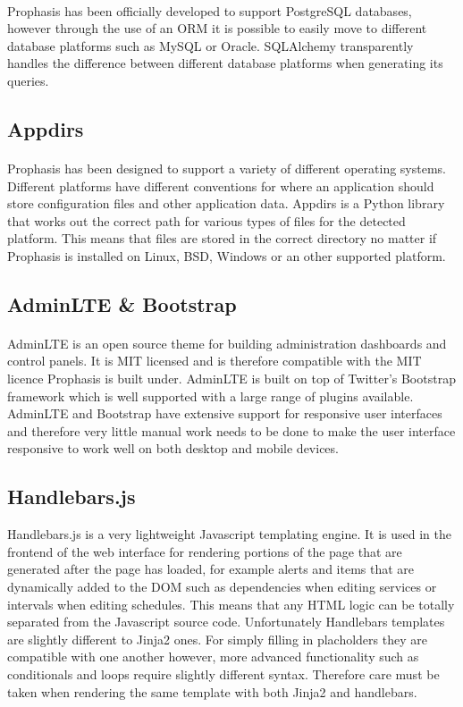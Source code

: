 \documentclass[bsc,logo,twoside,singlespacing]{infthesis}
\begin{document}
\paragraph*{}
	Prophasis has been officially developed to support PostgreSQL databases,
	however through the use of an ORM it is possible to easily move to different
	database platforms such as MySQL or Oracle.  SQLAlchemy transparently handles
	the difference between different database platforms when generating its
	queries.
	
\subsection{Appdirs}
\paragraph*{}
	Prophasis has been designed to support a variety of different operating
	systems.  Different platforms have different conventions for where an
	application should store configuration files and other application data.
	Appdirs is a Python library that works out the correct path for various types
	of files for the detected platform.  This means that files are stored in the
	correct directory no matter if Prophasis is installed on Linux, BSD, Windows
	or an other supported platform.

\subsection{AdminLTE \& Bootstrap}
\paragraph*{}
	AdminLTE is an open source theme for building administration dashboards and
	control panels.  It is MIT licensed and is therefore compatible with the MIT
	licence Prophasis is built under.  AdminLTE is built on top of Twitter's
	Bootstrap framework which is well supported with a large range of plugins
	available.  AdminLTE and Bootstrap have extensive support for responsive user
	interfaces and therefore very little manual work needs to be done to make the
	user interface responsive to work well on both desktop and mobile devices.

\subsection{Handlebars.js}
	Handlebars.js is a very lightweight Javascript templating engine.  It is used
	in the frontend of the web interface for rendering portions of the page that
	are generated after the page has loaded, for example alerts and items that are
	dynamically added to the DOM such as dependencies when editing services or
	intervals when editing schedules.  This means that any HTML logic can be
	totally separated from the Javascript source code.  Unfortunately Handlebars
	templates are slightly different to Jinja2 ones.  For simply filling in
	placholders they are compatible with one another however, more advanced
	functionality such as conditionals and loops require slightly different syntax.
	Therefore care must be taken when rendering the same template with both Jinja2
	and handlebars.
\end{document}
